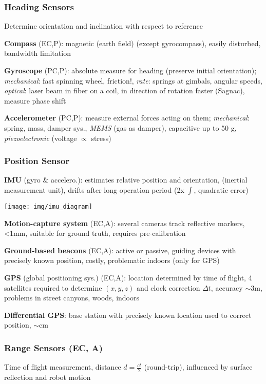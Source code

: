 \documentclass[fontsize=6pt]{scrartcl}
\begin{document}
\begin{multicols*}{4}
\subsubsection*{Heading Sensors}
Determine orientation and inclination with respect to reference

\textbf{Compass} (EC,P): magnetic (earth field) (except gyrocompass), easily disturbed, bandwidth limitation

\textbf{Gyroscope} (PC,P): absolute measure for heading (preserve initial orientation); \textit{mechanical}: fast spinning wheel, friction!, \textit{rate}: springs at gimbals, angular speeds, \textit{optical}: laser beam in fiber on a coil, in direction of rotation faster (Sagnac), measure phase shift

\textbf{Accelerometer} (PC,P): measure external forces acting on them; \textit{mechanical}: spring, mass, damper sys., \textit{MEMS} (gas as damper), capacitive up to 50 g, \textit{piezoelectronic} (voltage $\propto$ stress)

\subsubsection*{Position Sensor}
\textbf{IMU} (gyro \& accelero.): estimates	relative position and orientation, (inertial measurement unit), drifts after long operation period (2x $\int$, quadratic error)

\texttt{[image: img/imu\_diagram]}

\textbf{Motion-capture system} (EC,A): several cameras track reflective markers, <1mm, suitable for ground truth, requires pre-calibration

\textbf{Ground-based beacons} (EC,A): active or passive, guiding devices with precisely known position, costly, problematic indoors (only for GPS)

\textbf{GPS} (global positioning sys.) (EC,A): location determined by time of flight, 4 satellites required to determine $(x,y,z)$ and clock correction $\Delta t$, accuracy $\sim$3m, problems in street canyons, woods, indoors

\textbf{Differential GPS}: base station with precisely known location used to correct position, $\sim$cm

\subsubsection*{Range Sensors (EC, A)}

Time of flight measurement, distance $d= \frac{ct}{2}$ (round-trip), influenced by surface reflection and robot motion


\end{multicols*}
\end{document}
